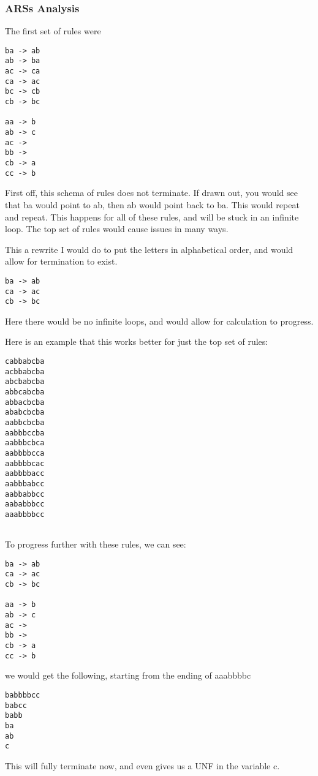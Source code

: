 \documentclass{article}
\theoremstyle{theorem}
\theoremstyle{definition}
\theoremstyle{remark}
\begin{document}
\subsubsection{ARSs Analysis}
The first set of rules were
\begin{verbatim}
ba -> ab
ab -> ba
ac -> ca
ca -> ac
bc -> cb
cb -> bc
 
aa -> b
ab -> c
ac ->  
bb ->
cb -> a
cc -> b
\end{verbatim}
First off, this schema of rules does not terminate. If drawn out, you would see that ba would point to ab, then ab would point back to ba. This would repeat and repeat. This happens for all of these rules, and will be stuck in an infinite loop. The top set of rules would cause issues in many ways.

\noindent\newline 

This a rewrite I would do to put the letters in alphabetical order, and would allow for termination to exist. 

\begin{verbatim}
ba -> ab
ca -> ac
cb -> bc
\end{verbatim}

\noindent\newline Here there would be no infinite loops, and would allow for calculation to progress.

Here is an example that this works better for just the top set of rules:
\begin{verbatim}
cabbabcba
acbbabcba
abcbabcba
abbcabcba
abbacbcba
ababcbcba
aabbcbcba
aabbbccba
aabbbcbca
aabbbbcca
aabbbbcac
aabbbbacc
aabbbabcc
aabbabbcc
aababbbcc
aaabbbbcc


\end{verbatim}

\noindent\newline To progress further with these rules, we can see:

\begin{verbatim}
ba -> ab
ca -> ac
cb -> bc
 
aa -> b
ab -> c
ac ->  
bb ->
cb -> a
cc -> b
\end{verbatim}

\noindent\newline we would get the following, starting from the ending of aaabbbbc
\begin{verbatim}
babbbbcc
babcc
babb
ba
ab
c
\end{verbatim}
 \noindent\newline This will fully terminate now, and even gives us a UNF in the variable c. 
 
\end{document}
